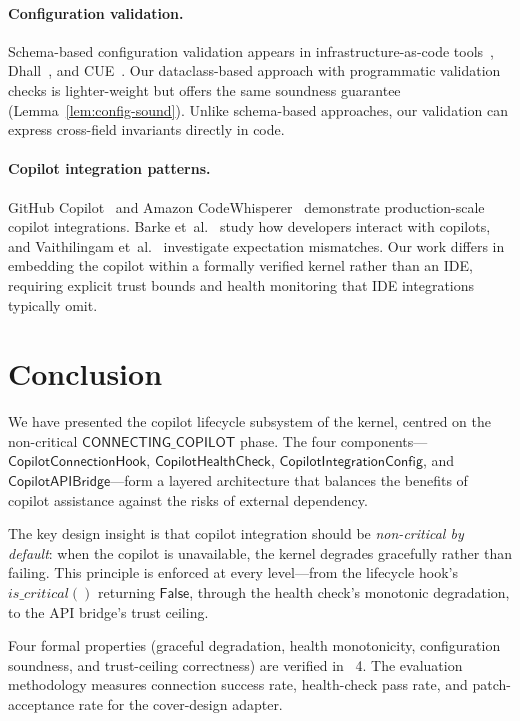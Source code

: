 \documentclass[11pt]{article}
\newcommand{\CCH}{\mathsf{CopilotConnectionHook}}
\newcommand{\CHC}{\mathsf{CopilotHealthCheck}}
\newcommand{\CIC}{\mathsf{CopilotIntegrationConfig}}
\newcommand{\CAB}{\mathsf{CopilotAPIBridge}}
\newcommand{\CONNECTING}{\mathsf{CONNECTING\_COPILOT}}
\begin{document}
\paragraph{Configuration validation.}
Schema-based configuration validation appears in infrastructure-as-code
tools~\cite{morris2016iac}, Dhall~\cite{volpe2020dhall}, and
CUE~\cite{cuelang2023}.  Our dataclass-based approach with
programmatic validation checks is lighter-weight but offers the same
soundness guarantee (Lemma~\ref{lem:config-sound}).  Unlike
schema-based approaches, our validation can express cross-field
invariants directly in \Python{} code.

\paragraph{Copilot integration patterns.}
GitHub Copilot~\cite{github2021copilot} and Amazon
CodeWhisperer~\cite{aws2023codewhisperer} demonstrate production-scale
copilot integrations.  Barke et~al.~\cite{barke2023grounded} study
how developers interact with copilots, and
Vaithilingam et~al.~\cite{vaithilingam2022expectation} investigate
expectation mismatches.  Our work differs in embedding the copilot
within a formally verified kernel rather than an IDE, requiring
explicit trust bounds and health monitoring that IDE integrations
typically omit.

\section{Conclusion}\label{sec:conclusion}

We have presented the copilot lifecycle subsystem of the \JuGeo{}
kernel, centred on the non-critical $\CONNECTING$ phase.  The
four components—$\CCH$, $\CHC$,
$\CIC$, and $\CAB$—form a layered
architecture that balances the benefits of copilot assistance
against the risks of external dependency.

The key design insight is that copilot integration should be
\emph{non-critical by default}: when the copilot is unavailable,
the kernel degrades gracefully rather than failing.  This
principle is enforced at every level—from the lifecycle hook's
$\mathit{is\_critical}()$ returning $\mathsf{False}$, through
the health check's monotonic degradation, to the API bridge's
trust ceiling.

Four formal properties (graceful degradation, health monotonicity,
configuration soundness, and trust-ceiling correctness) are
verified in \LEAN~4.  The evaluation methodology measures connection
success rate, health-check pass rate, and patch-acceptance rate for the
cover-design adapter.
\end{document}
